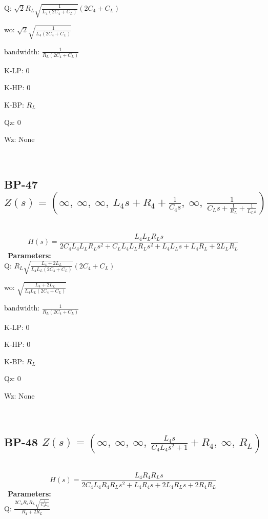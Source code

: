 \documentclass{article}
\begin{document}
Q: $\sqrt{2} R_{L} \sqrt{\frac{1}{L_{4} \left(2 C_{4} + C_{L}\right)}} \left(2 C_{4} + C_{L}\right)$\ 

wo: $\sqrt{2} \sqrt{\frac{1}{L_{4} \left(2 C_{4} + C_{L}\right)}}$\ 

bandwidth: $\frac{1}{R_{L} \left(2 C_{4} + C_{L}\right)}$\ 

K-LP: $0$\ 

K-HP: $0$\ 

K-BP: $R_{L}$\ 

Qz: $0$\ 

Wz: $\text{None}$\ 

\ 

\subsection{BP-47 $Z(s) = \left( \infty, \  \infty, \  \infty, \  L_{4} s + R_{4} + \frac{1}{C_{4} s}, \  \infty, \  \frac{1}{C_{L} s + \frac{1}{R_{L}} + \frac{1}{L_{L} s}}\right)$ } \ 
\textbf{\[H(s) = \frac{L_{4} L_{L} R_{L} s}{2 C_{4} L_{4} L_{L} R_{L} s^{2} + C_{L} L_{4} L_{L} R_{L} s^{2} + L_{4} L_{L} s + L_{4} R_{L} + 2 L_{L} R_{L}}\] } \ 
\textbf{Parameters:}\\ 

Q: $R_{L} \sqrt{\frac{L_{4} + 2 L_{L}}{L_{4} L_{L} \left(2 C_{4} + C_{L}\right)}} \left(2 C_{4} + C_{L}\right)$\ 

wo: $\sqrt{\frac{L_{4} + 2 L_{L}}{L_{4} L_{L} \left(2 C_{4} + C_{L}\right)}}$\ 

bandwidth: $\frac{1}{R_{L} \left(2 C_{4} + C_{L}\right)}$\ 

K-LP: $0$\ 

K-HP: $0$\ 

K-BP: $R_{L}$\ 

Qz: $0$\ 

Wz: $\text{None}$\ 

\ 

\subsection{BP-48 $Z(s) = \left( \infty, \  \infty, \  \infty, \  \frac{L_{4} s}{C_{4} L_{4} s^{2} + 1} + R_{4}, \  \infty, \  R_{L}\right)$ } \ 
\textbf{\[H(s) = \frac{L_{4} R_{4} R_{L} s}{2 C_{4} L_{4} R_{4} R_{L} s^{2} + L_{4} R_{4} s + 2 L_{4} R_{L} s + 2 R_{4} R_{L}}\] } \ 
\textbf{Parameters:}\\ 

Q: $\frac{2 C_{4} R_{4} R_{L} \sqrt{\frac{1}{C_{4} L_{4}}}}{R_{4} + 2 R_{L}}$\ 
\end{document}

